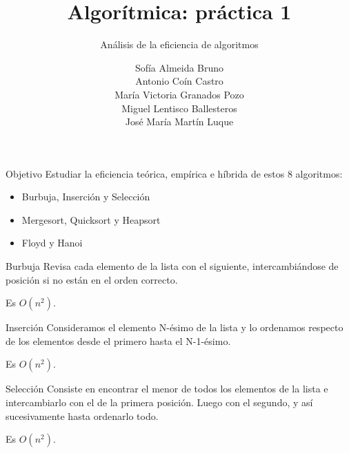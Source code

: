 \documentclass[spanish]{beamer}
\title{Algorítmica: práctica 1}
\subtitle{Análisis de la eficiencia de algoritmos}
\author{Sofía Almeida Bruno\\ Antonio Coín Castro\\ María Victoria Granados Pozo\\ Miguel Lentisco Ballesteros\\ José María Martín Luque}
\begin{document}
\maketitle

\begin{frame}{Objetivo}
	Estudiar la eficiencia teórica, empírica e híbrida de estos 8 algoritmos:
	
	\begin{itemize}
		\item Burbuja, Inserción y Selección
		\item Mergesort, Quicksort y Heapsort
		\item Floyd y Hanoi
	\end{itemize}
\end{frame}

\begin{frame}{Burbuja}
	Revisa cada elemento de la lista con el siguiente, intercambiándose de posición si no están en el orden correcto.
	
	\vskip 0.5cm
	
	Es $O(n^2)$.
	
\end{frame}

\begin{frame}{}
	\begin{center}
		
	\end{center}
\end{frame}

\begin{frame}{Inserción}
	Consideramos el elemento N-ésimo de la lista y lo ordenamos respecto de los elementos desde el primero hasta el N-1-ésimo.
	
	\vskip 0.5cm
	
	Es $O(n^2)$.
\end{frame}

\begin{frame}
	\begin{center}
		
	\end{center}
\end{frame}

\begin{frame}{Selección}
	Consiste en encontrar el menor de todos los elementos de la lista e intercambiarlo con el de la primera posición. Luego con el segundo, y así sucesivamente hasta ordenarlo todo.
	\vskip 0.5cm
	
	Es $O(n^2)$.
\end{frame}
\end{document}
